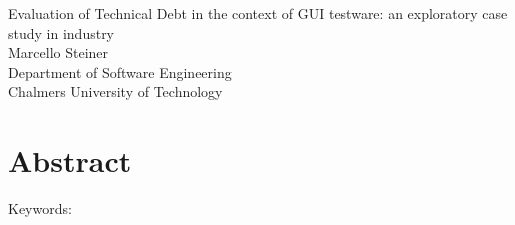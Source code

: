 Evaluation of Technical Debt in the context of GUI testware: an exploratory case study in industry\\
Marcello Steiner\\
Department of Software Engineering\\
Chalmers University of Technology\\

\thispagestyle{plain}			%
\section*{Abstract}


\vfill
Keywords: 

\newpage				%
\thispagestyle{empty}
\mbox{}